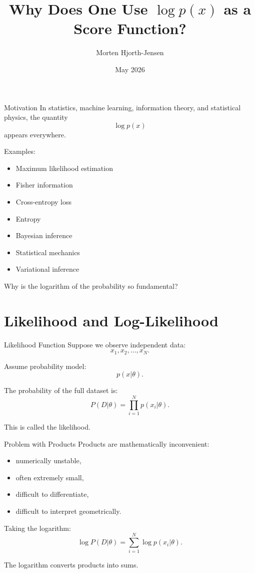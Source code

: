 \documentclass{beamer}
\title{Why Does One Use $\log p(x)$ as a Score Function?}
\author{Morten Hjorth-Jensen}
\date{May 2026}
\begin{document}
\begin{frame}
\titlepage
\end{frame}

\begin{frame}{Motivation}
In statistics, machine learning, information theory, and statistical physics, the quantity
\[
\log p(x)
\]
appears everywhere.

\medskip

Examples:
\begin{itemize}
\item Maximum likelihood estimation
\item Fisher information
\item Cross-entropy loss
\item Entropy
\item Bayesian inference
\item Statistical mechanics
\item Variational inference
\end{itemize}

\medskip

Why is the logarithm of the probability so fundamental?
\end{frame}

\section{Likelihood and Log-Likelihood}

\begin{frame}{Likelihood Function}
Suppose we observe independent data:
\[
x_1,x_2,\dots,x_N.
\]

Assume probability model:
\[
p(x|\theta).
\]

The probability of the full dataset is:
\[
P(D|\theta)
=
\prod_{i=1}^N p(x_i|\theta).
\]

This is called the likelihood.
\end{frame}

\begin{frame}{Problem with Products}
Products are mathematically inconvenient:
\begin{itemize}
\item numerically unstable,
\item often extremely small,
\item difficult to differentiate,
\item difficult to interpret geometrically.
\end{itemize}

\pause

Taking the logarithm:
\[
\log P(D|\theta)
=
\sum_{i=1}^N \log p(x_i|\theta).
\]

\pause

The logarithm converts products into sums.
\end{frame}
\end{document}
